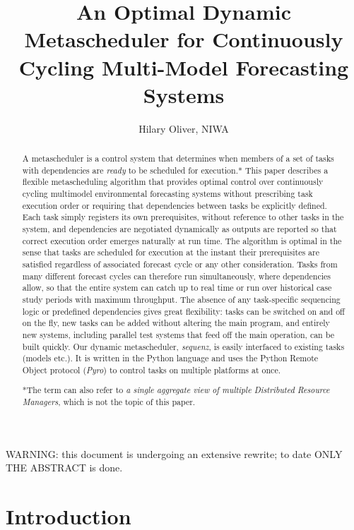 \documentclass[11pt,a4paper]{article}
\title{An Optimal Dynamic Metascheduler for Continuously Cycling
Multi-Model Forecasting Systems}
\author{Hilary Oliver, NIWA}
\begin{document}
\maketitle
\tableofcontents

{\huge WARNING: this document is undergoing an extensive rewrite; to
date ONLY THE ABSTRACT is done.}

\begin{abstract}

A metascheduler is a control system that determines when members of a
set of tasks with dependencies are {\em ready} to be scheduled for
execution.* This paper describes a flexible metascheduling algorithm
that provides optimal control over continuously cycling multimodel
environmental forecasting systems without prescribing task execution
order or requiring that dependencies between tasks be explicitly
defined. Each task simply registers its own prerequisites, without
reference to other tasks in the system, and dependencies are negotiated
dynamically as outputs are reported so that correct execution order
emerges naturally at run time.  The algorithm is optimal in the sense
that tasks are scheduled for execution at the instant their
prerequisites are satisfied regardless of associated forecast cycle or
any other consideration. Tasks from many different forecast cycles can
therefore run simultaneously, where dependencies allow, so that the
entire system can catch up to real time or run over historical case
study periods with maximum throughput. The absence of any task-specific
sequencing logic or predefined dependencies gives great flexibility:
tasks can be switched on and off on the fly, new tasks can be added
without altering the main program, and entirely new systems, including
parallel test systems that feed off the main operation, can be built
quickly. Our dynamic metascheduler, {\em sequenz}, is easily interfaced
to existing tasks (models etc.). It is written in the Python language
and uses the Python Remote Object protocol ({\em Pyro}) to control tasks
on multiple platforms at once. 

*The term can also refer to {\it a single aggregate view of multiple
Distributed Resource Managers}, which is not the topic of this paper.

\end{abstract}

\section{Introduction}
\end{document}
